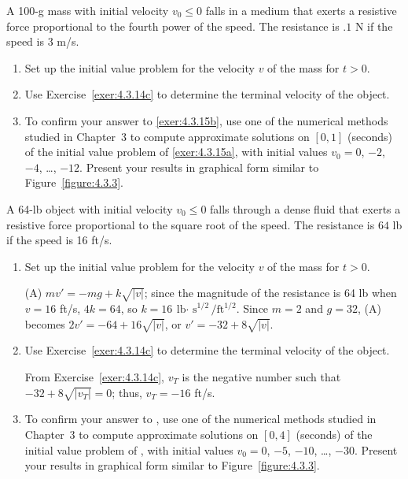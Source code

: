 \documentclass{ximera}
\begin{document}
\begin{problem}\label{exer:4.3.15}
A 100-g mass with initial velocity $v_0\le0$ falls in a medium that
exerts a resistive force proportional to the fourth power of the
speed. The resistance is $.1$ N if the speed is 3 m/s.

\begin{enumerate}
\item\label{exer:4.3.15a} %
Set up the initial value problem for the velocity $v$ of the mass for
$t>0$.
\item\label{exer:4.3.15b} %
Use Exercise~\ref{exer:4.3.14c} to determine the terminal velocity of
the object.

\item %
To confirm your answer to \ref{exer:4.3.15b},  use one of the numerical methods  studied
in Chapter~3 to compute  approximate solutions on $[0,1]$
(seconds) of the initial value problem of \ref{exer:4.3.15a}, with initial values
$v_0=0$, $-2$, $-4$, \dots, $-12$. Present your results in graphical form
similar to Figure~\ref{figure:4.3.3}.
\end{enumerate}
\end{problem}

\begin{problem}\label{exer:4.3.16}
A 64-lb object with initial velocity $v_0\le0$ falls through a dense
fluid that exerts a resistive force proportional to the square root of
the speed. The resistance is $64$ lb if the speed is 16 ft/s.

\begin{enumerate}
\item\label{exer:4.3.16a} %
Set up the initial value problem for the velocity $v$ of the mass for
$t>0$.

\begin{solution}
(A) $mv'=-mg+k\sqrt{|v|}$; since the magnitude of the
resistance is 64 lb when $v=16$ ft/s, $4k=64$, so $k=16 \
\mbox{lb$\cdot$ s}^{1/2}/\mbox{ft}^{1/2}$. Since $m=2$ and $g=32$,
(A) becomes $2v'=-64+16\sqrt{|v|}$, or $v'=-32+8\sqrt{|v|}$.
\end{solution}

\item\label{exer:4.3.16b} %
Use Exercise~\ref{exer:4.3.14c} to determine the terminal velocity of
the object.

\begin{solution}
From Exercise~\ref{exer:4.3.14c}, $v_T$ is the negative
number such that $-32+8\sqrt{|v_T|}=0$; thus, $v_T=-16$ ft/s.
\end{solution}

\item %
 
To confirm your answer to \label{exer:4.3.16b}, use one of the numerical methods
studied in Chapter~3 to compute approximate
solutions on
$[0,4]$ (seconds) of the initial value problem of \label{exer:4.3.16a}, with
initial values $v_0=0$, $-5$, $-10$, \dots, $-30$. Present your results in
graphical form similar to Figure~\ref{figure:4.3.3}.
\end{enumerate}

\end{problem}
\end{document}

